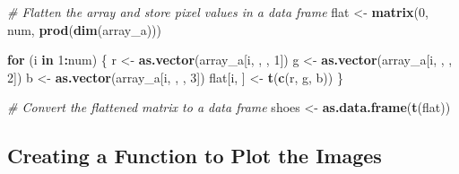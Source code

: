 \documentclass[
]{article}
\newenvironment{Shaded}{\begin{snugshade}}{\end{snugshade}}
\newcommand{\CommentTok}[1]{\textcolor[rgb]{0.56,0.35,0.01}{\textit{#1}}}
\newcommand{\ControlFlowTok}[1]{\textcolor[rgb]{0.13,0.29,0.53}{\textbf{#1}}}
\newcommand{\DecValTok}[1]{\textcolor[rgb]{0.00,0.00,0.81}{#1}}
\newcommand{\FunctionTok}[1]{\textcolor[rgb]{0.13,0.29,0.53}{\textbf{#1}}}
\newcommand{\NormalTok}[1]{#1}
\newcommand{\OtherTok}[1]{\textcolor[rgb]{0.56,0.35,0.01}{#1}}
\newcommand{\SpecialCharTok}[1]{\textcolor[rgb]{0.81,0.36,0.00}{\textbf{#1}}}
\begin{document}
\begin{Shaded}
\begin{Highlighting}[]
\CommentTok{\# Flatten the array and store pixel values in a data frame}
\NormalTok{flat }\OtherTok{\textless{}{-}} \FunctionTok{matrix}\NormalTok{(}\DecValTok{0}\NormalTok{, num, }\FunctionTok{prod}\NormalTok{(}\FunctionTok{dim}\NormalTok{(array\_a)))}

\ControlFlowTok{for}\NormalTok{ (i }\ControlFlowTok{in} \DecValTok{1}\SpecialCharTok{:}\NormalTok{num) \{}
\NormalTok{    r }\OtherTok{\textless{}{-}} \FunctionTok{as.vector}\NormalTok{(array\_a[i, , , }\DecValTok{1}\NormalTok{])}
\NormalTok{    g }\OtherTok{\textless{}{-}} \FunctionTok{as.vector}\NormalTok{(array\_a[i, , , }\DecValTok{2}\NormalTok{])}
\NormalTok{    b }\OtherTok{\textless{}{-}} \FunctionTok{as.vector}\NormalTok{(array\_a[i, , , }\DecValTok{3}\NormalTok{])}
\NormalTok{    flat[i, ] }\OtherTok{\textless{}{-}} \FunctionTok{t}\NormalTok{(}\FunctionTok{c}\NormalTok{(r, g, b))}
\NormalTok{\}}

\CommentTok{\# Convert the flattened matrix to a data frame}
\NormalTok{shoes }\OtherTok{\textless{}{-}} \FunctionTok{as.data.frame}\NormalTok{(}\FunctionTok{t}\NormalTok{(flat))}
\end{Highlighting}
\end{Shaded}

\hypertarget{creating-a-function-to-plot-the-images}{%
\subsection{Creating a Function to Plot the
Images}\label{creating-a-function-to-plot-the-images}}
\end{document}
